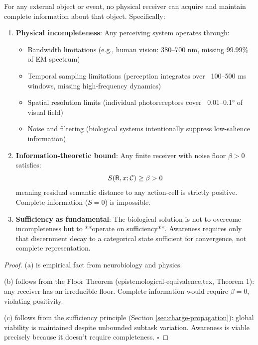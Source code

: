 \begin{theorem}
\label{thm:discernment-incomplete}
For any external object or event, no physical receiver can acquire and maintain complete information about that object. Specifically:

\begin{enumerate}[label=(\alph*),leftmargin=*]
\item \textbf{Physical incompleteness}: Any perceiving system operates through:
\begin{itemize}
\item Bandwidth limitations (e.g., human vision: 380--700 nm, missing 99.99\% of EM spectrum)
\item Temporal sampling limitations (perception integrates over ~100--500 ms windows, missing high-frequency dynamics)
\item Spatial resolution limits (individual photoreceptors cover ~0.01--0.1° of visual field)
\item Noise and filtering (biological systems intentionally suppress low-salience information)
\end{itemize}

\item \textbf{Information-theoretic bound}: Any finite receiver with noise floor $\beta > 0$ satisfies:
$$S(\mathsf{R}, x; \mathcal{C}) \geq \beta > 0$$
meaning residual semantic distance to any action-cell is strictly positive. Complete information ($S = 0$) is impossible.

\item \textbf{Sufficiency as fundamental}: The biological solution is not to overcome incompleteness but to **operate on sufficiency**. Awareness requires only that discernment decay to a categorical state sufficient for convergence, not complete representation.
\end{enumerate}
\end{theorem}

\begin{proof}
(a) is empirical fact from neurobiology and physics.

(b) follows from the Floor Theorem (epistemological-equivalence.tex, Theorem 1): any receiver has an irreducible floor. Complete information would require $\beta = 0$, violating positivity.

(c) follows from the sufficiency principle (Section \ref{sec:charge-propagation}): global viability is maintained despite unbounded subtask variation. Awareness is viable precisely because it doesn't require completeness. $\square$
\end{proof}

